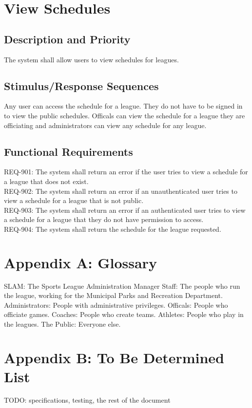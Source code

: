 \documentclass{scrreprt}
\begin{document}
    \section{View Schedules}
    \subsection{Description and Priority}
    The system shall allow users to view schedules for leagues.
    \subsection{Stimulus/Response Sequences}
    Any user can access the schedule for a league. They do not have to be signed in to view the public schedules. Officals can view the schedule for a league they are officiating and administrators can view any schedule for any league.
    \subsection{Functional Requirements}
    REQ-901: The system shall return an error if the user tries to view a schedule for a league that does not exist. \\
    REQ-902: The system shall return an error if an unauthenticated user tries to view a schedule for a league that is not public. \\
    REQ-903: The system shall return an error if an authenticated user tries to view a schedule for a league that they do not have permission to access. \\
    REQ-904: The system shall return the schedule for the league requested.


\section{Appendix A: Glossary}
SLAM: The Sports League Administration Manager
Staff: The people who run the league, working for the Municipal Parks and Recreation Department.
Administrators: People with administrative privileges.
Officals: People who officiate games.
Coaches: People who create teams.
Athletes: People who play in the leagues.
The Public: Everyone else.


\section{Appendix B: To Be Determined List}
TODO: specifications, testing, the rest of the document
\end{document}
